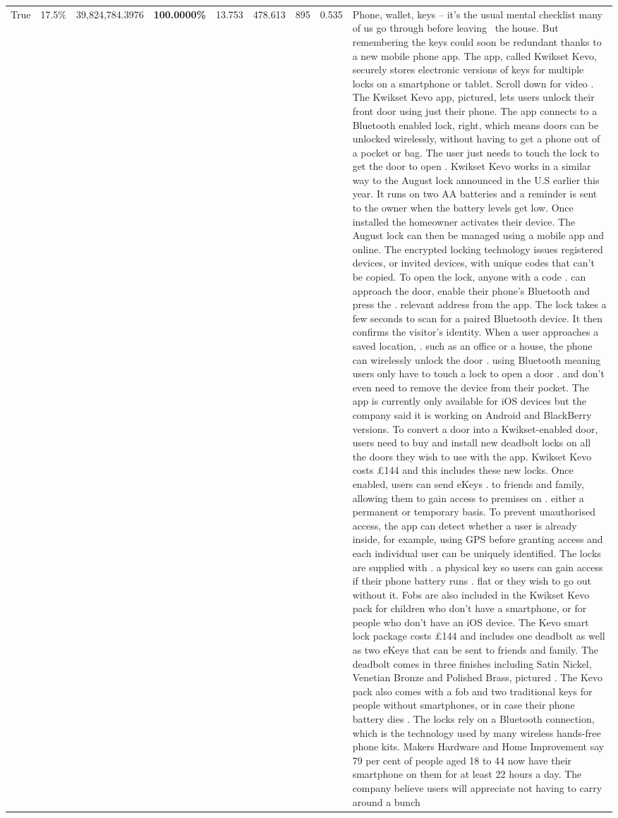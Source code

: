 \begin{table}[H]
\begin{tabular}{lllrlllll}
True & 17.5\% & 39,824,784.3976 & \bfseries \color{red} 100.0000\% & 13.753 & 478.613 & 895 & 0.535 & Phone, wallet, keys – it’s the usual mental checklist many of us go through before leaving  the house. But remembering the keys could soon be redundant thanks to a new mobile phone app. The app, called Kwikset Kevo, securely stores electronic versions of keys for multiple locks on a smartphone or tablet. Scroll down for video . The Kwikset Kevo app, pictured, lets users unlock their front door using just their phone. The app connects to a Bluetooth enabled lock, right, which means doors can be unlocked wirelessly, without having to get a phone out of a pocket or bag. The user just needs to touch the lock to get the door to open . Kwikset Kevo works in a similar way to the August lock announced in the U.S earlier this year. It runs on two AA batteries and a reminder is sent to the owner when the battery levels get low. Once installed the homeowner activates their device. The August lock can then be managed using a mobile app and online. The encrypted locking technology issues registered devices, or invited devices, with unique codes that can't be copied. To open the lock, anyone with a code . can approach the door, enable their phone's Bluetooth and press the . relevant address from the app. The lock takes a few seconds to scan for a paired Bluetooth device. It then confirms the visitor's identity. When a user approaches a saved location, . such as an office or a house, the phone can wirelessly unlock the door . using Bluetooth meaning users only have to touch a lock to open a door . and don't even need to remove the device from their pocket. The app is currently only available for iOS devices but the company said it is working on Android and BlackBerry versions. To convert a door into a Kwikset-enabled door, users need to buy and install new deadbolt locks on all the doors they wish to use with the app. Kwikset Kevo costs £144 and this includes these new locks. Once enabled, users can send eKeys . to friends and family, allowing them to gain access to premises on . either a permanent or temporary basis. To prevent unauthorised access, the app can detect whether a user is already inside, for example, using GPS before granting access and each individual user can be uniquely identified. The locks are supplied with . a physical key so users can gain access if their phone battery runs . flat or they wish to go out without it. Fobs are also included in the Kwikset Kevo pack for children who don't have a smartphone, or for people who don't have an iOS device. The Kevo smart lock package costs £144 and includes one deadbolt as well as two eKeys that can be sent to friends and family. The deadbolt comes in three finishes including Satin Nickel, Venetian Bronze and Polished Brass, pictured . The Kevo pack also comes with a fob and two traditional keys for people without smartphones, or in case their phone battery dies . The locks rely on a Bluetooth connection, which is the technology used by many wireless hands-free phone kits. Makers Hardware and Home Improvement say 79 per cent of people aged 18 to 44 now have their smartphone on them for at least 22 hours a day. The company believe users will appreciate not having to carry around a bunch 
\end{tabular}
\end{table}
